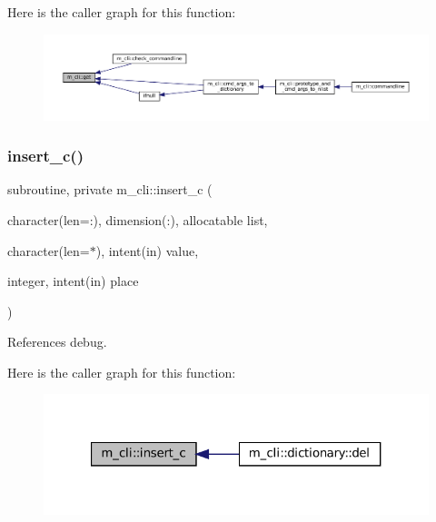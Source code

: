 Here is the caller graph for this function\+:\nopagebreak
\begin{figure}[H]
\begin{center}
\leavevmode
\includegraphics[width=350pt]{namespacem__cli_a45783c194a1484042f63c58b180ca8df_icgraph}
\end{center}
\end{figure}
\mbox{\label{namespacem__cli_a9baf1cf0e20942fbde8c025ead5a30db}} 
\subsubsection{\texorpdfstring{insert\+\_\+c()}{insert\_c()}}
{\footnotesize\ttfamily subroutine, private m\+\_\+cli\+::insert\+\_\+c (\begin{DoxyParamCaption}\item[{character(len=\+:), dimension(\+:), allocatable}]{list,  }\item[{character(len=$\ast$), intent(in)}]{value,  }\item[{integer, intent(in)}]{place }\end{DoxyParamCaption})\hspace{0.3cm}{\ttfamily [private]}}



References debug.

Here is the caller graph for this function\+:\nopagebreak
\begin{figure}[H]
\begin{center}
\leavevmode
\includegraphics[width=321pt]{namespacem__cli_a9baf1cf0e20942fbde8c025ead5a30db_icgraph}
\end{center}
\end{figure}
\mbox{\label{namespacem__cli_a030e31579a7968aea68d80db1e36ebfd}} 
